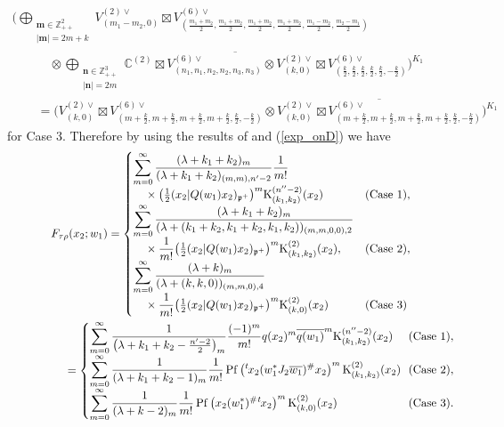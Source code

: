 \documentclass[pdftex]{sigma}
\numberwithin{equation}{section}
\newcommand{\ds}{\displaystyle}
\newcommand{\bm}{\mathbf{m}}
\newcommand{\bn}{\mathbf{n}}
\newcommand{\BZ}{\mathbb{Z}}
\newcommand{\BC}{\mathbb{C}}
\newcommand{\fp}{\mathfrak{p}}
\newcommand{\rK}{\mathrm{K}}
\newcommand{\Pf}{\operatorname{Pf}}
\begin{document}
\begin{gather*}
\Big(\bigoplus_{\substack{\bm\in\BZ_{++}^2\\ |\bm|=2m+k}}V_{(m_1-m_2,0)}^{(2)\vee}\boxtimes
V_{\left(\frac{m_1+m_2}{2},\frac{m_1+m_2}{2},\frac{m_1+m_2}{2},\frac{m_1+m_2}{2},\frac{m_1-m_2}{2},\frac{m_2-m_1}{2}\right)}^{(6)\vee} \\
\qquad\quad{} \otimes\overline{\bigoplus_{\substack{\bn\in\BZ_{++}^3\\ |\bn|=2m}}
\BC^{(2)}\boxtimes V_{(n_1,n_1,n_2,n_2,n_3,n_3)}^{(6)\vee}
\otimes V_{(k,0)}^{(2)\vee}\boxtimes V_{\left(\frac{k}{2},\frac{k}{2},\frac{k}{2},\frac{k}{2},\frac{k}{2},-\frac{k}{2}\right)}^{(6)\vee}}
\Big)^{K_1}\\
\qquad{}=\Big(V_{(k,0)}^{(2)\vee}\boxtimes V_{\left(m+\frac{k}{2},m+\frac{k}{2},m+\frac{k}{2},m+\frac{k}{2},\frac{k}{2},-\frac{k}{2}\right)}^{(6)\vee}
\otimes\overline{V_{(k,0)}^{(2)\vee}\boxtimes
V_{\left(m+\frac{k}{2},m+\frac{k}{2},m+\frac{k}{2},m+\frac{k}{2},\frac{k}{2},-\frac{k}{2}\right)}^{(6)\vee}}\Big)^{K_1}
\end{gather*}
for Case 3. Therefore by using the results of \cite{N2} and (\ref{exp_onD}) we have
\begin{gather*}
 F_{\tau\rho}(x_2;w_1) =\begin{cases}
\ds \sum_{m=0}^{\infty}\frac{(\lambda+k_1+k_2)_m}{(\lambda+k_1+k_2)_{(m,m),n'-2}}\frac{1}{m!}& \\
\quad{}\times \big(\tfrac{1}{2}(x_2|Q(w_1)x_2)_{\fp^+}\big)^m
\rK_{(k_1,k_2)}^{(n''-2)}(x_2) & (\text{Case }1),\\
\ds \sum_{m=0}^\infty \frac{(\lambda+k_1+k_2)_m}{(\lambda+(k_1+k_2,k_1+k_2,k_1,k_2))_{(m,m,0,0),2}}& \\
\quad{}\times
\dfrac{1}{m!}\big(\tfrac{1}{2}(x_2|Q(w_1)x_2)_{\fp^+}\big)^m\rK_{(k_1,k_2)}^{(2)}(x_2),& (\text{Case }2),\\
\ds \sum_{m=0}^\infty \frac{(\lambda+k)_m}{(\lambda+(k,k,0))_{(m,m,0),4}}& \\
\quad{}\times \dfrac{1}{m!}\big(\tfrac{1}{2}(x_2|Q(w_1)x_2)_{\fp^+}\big)^m
\rK_{(k,0)}^{(2)}(x_2) & (\text{Case }3)\end{cases}\\
 \hphantom{F_{\tau\rho}(x_2;w_1)}{} =\begin{cases}
\ds \sum_{m=0}^{\infty}\frac{1}{\left(\lambda+k_1+k_2-\frac{n'-2}{2}\right)_m}\frac{(-1)^m}{m!}q(x_2)^m\overline{q(w_1)}^m
\rK_{(k_1,k_2)}^{(n''-2)}(x_2) & (\text{Case }1),\\
\ds \sum_{m=0}^\infty \frac{1}{(\lambda+k_1+k_2-1)_m}\frac{1}{m!}\Pf\left({}^t\hspace{-1pt}x_2(w_1^*J_2\overline{w_1})^\#x_2\right)^m
\rK_{(k_1,k_2)}^{(2)}(x_2)\!\! & (\text{Case }2),\\
\ds \sum_{m=0}^\infty \frac{1}{(\lambda+k-2)_m}\frac{1}{m!}\Pf\left(x_2(w_1^*)^\#{}^t\hspace{-1pt}x_2\right)^m
\rK_{(k,0)}^{(2)}(x_2) & (\text{Case }3).
\end{cases}
\end{gather*}
\end{document}
